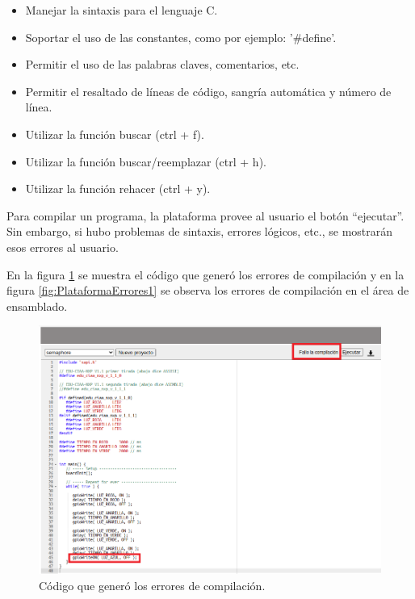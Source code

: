 \begin{itemize}
\item Manejar la sintaxis para el lenguaje C.
\item Soportar el uso de las constantes, como por ejemplo: '\#define'.
\item Permitir el uso de las palabras claves, comentarios, etc.
\item Permitir el resaltado de líneas de código, sangría automática y número de línea.
\item Utilizar la función buscar (ctrl + f).
\item Utilizar la función buscar/reemplazar (ctrl + h).
\item Utilizar la función rehacer (ctrl + y).
\end{itemize}


Para compilar un programa, la plataforma provee al usuario el botón “ejecutar”. Sin embargo, si hubo problemas de sintaxis, errores lógicos, etc., se mostrarán esos errores al usuario.

En la figura \ref{fig:PlataformaErrores2} se muestra el código que generó los errores de compilación y en la figura \ref{fig:PlataformaErrores1} se observa los errores de compilación en el área de ensamblado.



\begin{figure}[ht]
	\centering
	\includegraphics[scale=.39]{./Figures/PlataformaErrores1.png}
	\caption{Código que generó los errores de compilación.}
	\label{fig:PlataformaErrores2}
\end{figure}



